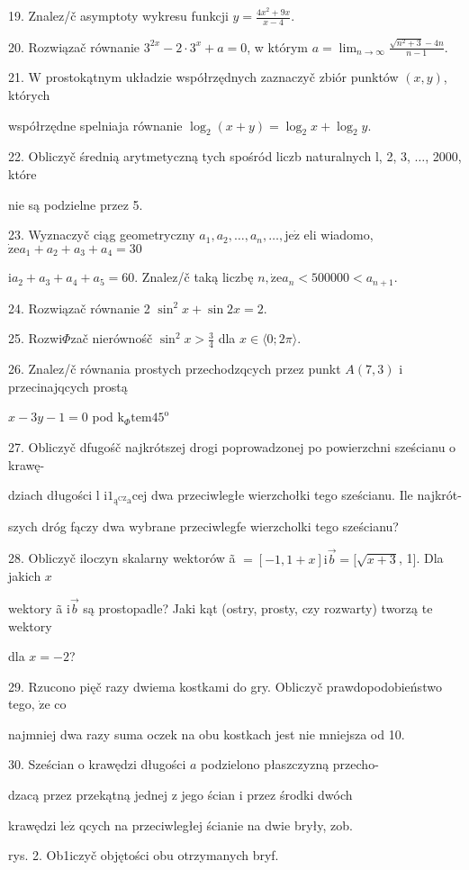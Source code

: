 \documentclass[a4paper,12pt]{article}
\begin{document}
19. Znalez/č asymptoty wykresu funkcji $y=\displaystyle \frac{4x^{2}+9x}{x-4}.$

20. Rozwiązač równanie $3^{2x}-2\cdot 3^{x}+a=0$, w którym $a=\displaystyle \lim_{n\rightarrow\infty}\frac{\sqrt{n^{2}+3}-4n}{n-1}.$

21. $\mathrm{W}$ prostokątnym układzie współrzędnych zaznaczyč zbiór punktów $(x,y)$, których

współrzędne spelniaja równanie $\log_{2}(x+y)=\log_{2}x+\log_{2}y.$

22. Obliczyč średnią arytmetyczną tych spośród liczb naturalnych l, 2, 3, $\ldots$, 2000, które

nie są podzielne przez 5.

23. Wyznaczyč ciąg geometryczny $a_{1}, a_{2}, \ldots, a_{n}, \ldots, \mathrm{j}\mathrm{e}\dot{\mathrm{z}}$ eli wiadomo, $\dot{\mathrm{z}}\mathrm{e}a_{1}+a_{2}+a_{3}+a_{4}=30$

$\mathrm{i}a_{2}+a_{3}+a_{4}+a_{5}=60$. Znalez/č taką liczbę $n, \dot{\mathrm{z}}\mathrm{e}a_{n}<500000<a_{n+1}.$

24. Rozwiązač równanie 2 $\sin^{2}x+\sin 2x=2.$

25. Rozwi$\Phi$zač nierównośč $\displaystyle \sin^{2}x>\frac{3}{4}$ dla $x\in\langle 0;2\pi\rangle.$

26. Znalez/č równania prostych przechodzqcych przez punkt $A(7,3)$ i przecinajqcych prostą

$x-3y-1=0$ pod $\mathrm{k}_{\Phi}\mathrm{t}\mathrm{e}\mathrm{m}45^{\mathrm{o}}$

27. Obliczyč dfugośč najkrótszej drogi poprowadzonej po powierzchni sześcianu o krawę-

dziach długości l $\mathrm{i}1_{\text{ą}^{\mathrm{C}\mathrm{Z}}\mathrm{a}}\mathrm{c}\mathrm{e}\mathrm{j}$ dwa przeciwległe wierzchołki tego sześcianu. Ile najkrót-

szych dróg fączy dwa wybrane przeciwlegfe wierzcholki tego sześcianu?

28. Obliczyč iloczyn skalarny wektorów ã $= [-1,1+x] \mathrm{i} \vec{b}= [\sqrt{x+3}$, 1$]$. Dla jakich $x$

wektory ã $\mathrm{i}\vec{b}$ są prostopadle? Jaki kąt (ostry, prosty, czy rozwarty) tworzą te wektory

dla $x=-2$?

29. Rzucono pięč razy dwiema kostkami do gry. Obliczyč prawdopodobieństwo tego, $\dot{\mathrm{z}}\mathrm{e}$ co

najmniej dwa razy suma oczek na obu kostkach jest nie mniejsza od 10.

30. Sześcian o krawędzi długości $a$ podzielono płaszczyzną przecho-

dzacą przez przekątną jednej z jego ścian i przez środki dwóch

krawędzi $\mathrm{l}\mathrm{e}\dot{\mathrm{z}}$ qcych na przeciwległej ścianie na dwie bryły, zob.

rys. 2. Ob1iczyč objętości obu otrzymanych bryf.
\end{document}
